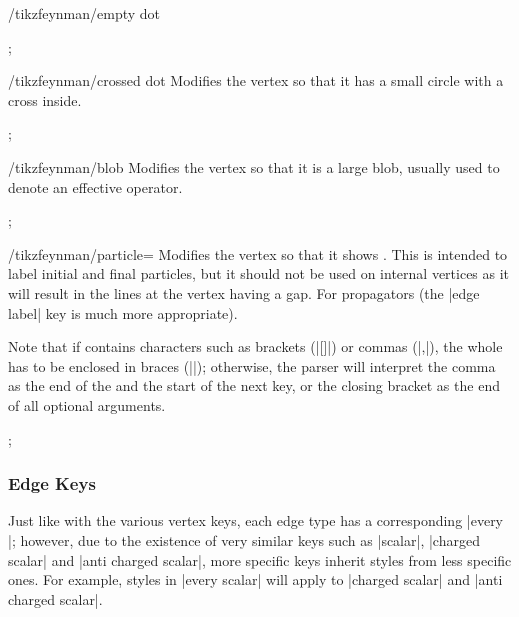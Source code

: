 \documentclass[a4paper,final]{ltxdoc}
\begin{document}
\begin{codeexample}[execute code=false]
\begin{key}{/tikzfeynman/empty dot}
\begin{codeexample}[]
;
\end{codeexample}
\end{key}

\begin{key}{/tikzfeynman/crossed dot}
  Modifies the vertex so that it has a small circle with a cross inside.

\begin{codeexample}[]
;
\end{codeexample}
\end{key}

\begin{key}{/tikzfeynman/blob}
  Modifies the vertex so that it is a large blob, usually used to denote an
  effective operator.

\begin{codeexample}[]
;
\end{codeexample}
\end{key}

\begin{key}{/tikzfeynman/particle=}
  Modifies the vertex so that it shows .  This is intended to label
  initial and final particles, but it should not be used on internal vertices as
  it will result in the lines at the vertex having a gap.  For propagators (the
  |edge label| key is much more appropriate).

  Note that if  contains characters such as brackets (|[]|) or
  commas (|,|), the whole  has to be enclosed in braces (|{}|);
  otherwise, the parser will interpret the comma as the end of the 
  and the start of the next key, or the closing bracket as the end of all
  optional arguments.

\begin{codeexample}[]
;
\end{codeexample}
\end{key}


\subsubsection{Edge Keys}
\label{subsubsec:edge_keys}

Just like with the various vertex keys, each edge type has a corresponding
|every |; however, due to the existence of very similar keys
such as |scalar|, |charged scalar| and |anti charged scalar|, more specific keys
inherit styles from less specific ones.  For example, styles in |every scalar|
will apply to |charged scalar| and |anti charged scalar|.


\end{codeexample}
\end{document}
